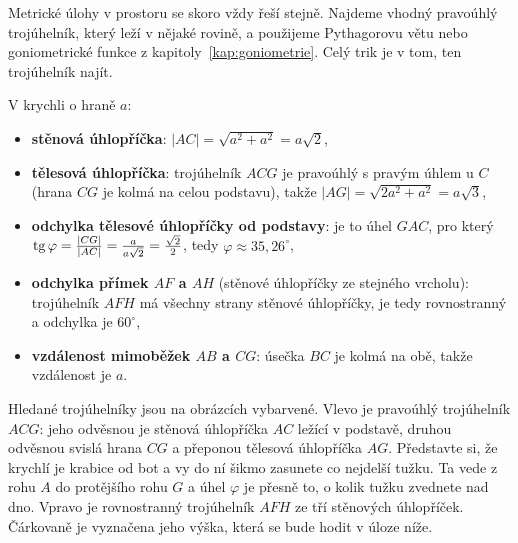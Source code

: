 Metrické úlohy v prostoru se skoro vždy řeší stejně. Najdeme vhodný pravoúhlý trojúhelník, který leží v nějaké rovině, a použijeme Pythagorovu větu nebo goniometrické funkce z kapitoly~\ref{kap:goniometrie}. Celý trik je v tom, ten trojúhelník najít.

\begin{example}\label{ex:krychle-uhlopricky}
  V krychli o hraně $a$:
  \begin{itemize}
    \item \textbf{stěnová úhlopříčka}: $|AC| = \sqrt{a^2 + a^2} = a\sqrt{2}$,
    \item \textbf{tělesová úhlopříčka}: trojúhelník $ACG$ je pravoúhlý s pravým úhlem u $C$ (hrana $CG$ je kolmá na celou podstavu), takže $|AG| = \sqrt{2a^2 + a^2} = a\sqrt{3}$,
    \item \textbf{odchylka tělesové úhlopříčky od podstavy}: je to úhel $GAC$, pro který $\operatorname{tg}\varphi = \frac{|CG|}{|AC|} = \frac{a}{a\sqrt{2}} = \frac{\sqrt{2}}{2}$, tedy $\varphi\approx 35{,}26^\circ$,
    \item \textbf{odchylka přímek $AF$ a $AH$} (stěnové úhlopříčky ze stejného vrcholu): trojúhelník $AFH$ má všechny strany stěnové úhlopříčky, je tedy rovnostranný a odchylka je $60^\circ$,
    \item \textbf{vzdálenost mimoběžek $AB$ a $CG$}: úsečka $BC$ je kolmá na obě, takže vzdálenost je $a$.
  \end{itemize}
\end{example}

Hledané trojúhelníky jsou na obrázcích vybarvené. Vlevo je pravoúhlý trojúhelník $ACG$: jeho odvěsnou je stěnová úhlopříčka $AC$ ležící v podstavě, druhou odvěsnou svislá hrana $CG$ a přeponou tělesová úhlopříčka $AG$. Představte si, že krychlí je krabice od bot a vy do ní šikmo zasunete co nejdelší tužku. Ta vede z rohu $A$ do protějšího rohu $G$ a úhel $\varphi$ je přesně to, o kolik tužku zvednete nad dno. Vpravo je rovnostranný trojúhelník $AFH$ ze tří stěnových úhlopříček. Čárkovaně je vyznačena jeho výška, která se bude hodit v úloze níže.

